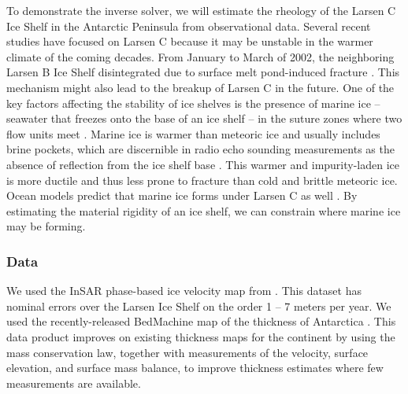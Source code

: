\documentclass[journal abbreviation, manuscript]{copernicus}
\begin{document}
To demonstrate the inverse solver, we will estimate the rheology of the Larsen C Ice Shelf in the Antarctic Peninsula from observational data.
Several recent studies have focused on Larsen C because it may be unstable in the warmer climate of the coming decades.
From January to March of 2002, the neighboring Larsen B Ice Shelf disintegrated due to surface melt pond-induced fracture \citep{banwell2013breakup}.
This mechanism might also lead to the breakup of Larsen C in the future.
One of the key factors affecting the stability of ice shelves is the presence of marine ice -- seawater that freezes onto the base of an ice shelf -- in the suture zones where two flow units meet \citep{kulessa2014marine}.
Marine ice is warmer than meteoric ice and usually includes brine pockets, which are discernible in radio echo sounding measurements as the absence of reflection from the ice shelf base \citep{holland2009marine}.
This warmer and impurity-laden ice is more ductile and thus less prone to fracture than cold and brittle meteoric ice.
Ocean models predict that marine ice forms under Larsen C as well \citep{holland2009marine}.
By estimating the material rigidity of an ice shelf, we can constrain where marine ice may be forming.


\subsubsection{Data}

We used the InSAR phase-based ice velocity map from \citet{mouginot2019continent}.
This dataset has nominal errors over the Larsen Ice Shelf on the order 1 -- 7 meters per year.
We used the recently-released BedMachine map of the thickness of Antarctica \citep{morlighem2019deep}.
This data product improves on existing thickness maps for the continent by using the mass conservation law, together with measurements of the velocity, surface elevation, and surface mass balance, to improve thickness estimates where few measurements are available.
\end{document}

